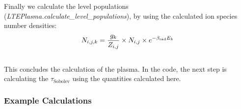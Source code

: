 \documentclass[letterpaper,10pt,english]{sphinxmanual}
\begin{document}
Finally we calculate the level populations (\emph{LTEPlasma.calculate\_level\_populations}), by using the calculated ion species number densities:
\begin{gather}
\begin{split}N_{i, j, k} = \frac{g_k}{Z_{i, j}}\times N_{i, j} \times e^{-\beta_\textrm{rad} E_k}\end{split}\notag\\\begin{split}\end{split}\notag
\end{gather}
This concludes the calculation of the plasma. In the code, the next step is calculating the $\tau_\textrm{Sobolev}$ using
the quantities calculated here.


\subsubsection{Example Calculations}
\label{plasma_doc/lte_plasma:example-calculations}
\end{document}
